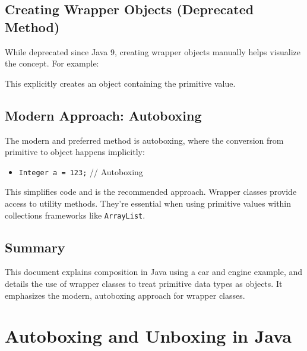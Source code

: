 \documentclass{article}
\begin{document}
\subsection{Creating Wrapper Objects (Deprecated Method)}

While deprecated since Java 9, creating wrapper objects manually helps visualize the concept.  For example:


This explicitly creates an object containing the primitive value.

\subsection{Modern Approach: Autoboxing}

The modern and preferred method is autoboxing, where the conversion from primitive to object happens implicitly:

\begin{itemize}
    \item \texttt{Integer a = 123;} // Autoboxing
\end{itemize}

This simplifies code and is the recommended approach.  Wrapper classes provide access to utility methods.  They're essential when using primitive values within collections frameworks like \texttt{ArrayList}.

\subsection{Summary}

This document explains composition in Java using a car and engine example, and details the use of wrapper classes to treat primitive data types as objects.  It emphasizes the modern, autoboxing approach for wrapper classes.


\section{Autoboxing and Unboxing in Java}
\end{document}
